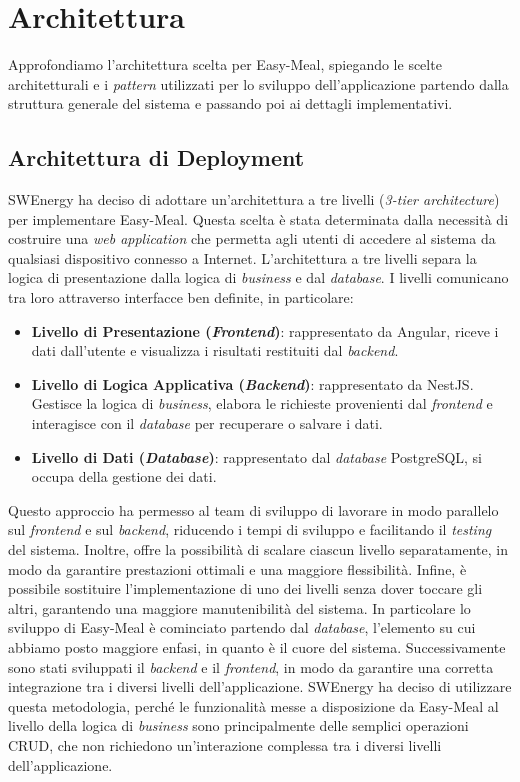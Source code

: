\section{Architettura}

Approfondiamo l'architettura scelta per Easy-Meal, spiegando le scelte
architetturali e i \textit{pattern} utilizzati per lo sviluppo dell'applicazione partendo
dalla struttura generale del sistema e passando poi ai dettagli implementativi.

\subsection{Architettura di Deployment}

SWEnergy ha deciso di adottare un'architettura a tre livelli (\textit{3-tier
architecture}) per implementare Easy-Meal. 
Questa scelta è stata determinata dalla necessità di costruire una 
\textit{web application} che permetta agli utenti di accedere al sistema da qualsiasi 
dispositivo connesso a Internet. L'architettura a tre livelli
separa la logica di presentazione dalla logica di \textit{business} e dal \textit{database}.
I livelli comunicano tra loro attraverso interfacce ben definite, in particolare:
\begin{itemize}
	\item \textbf{Livello di Presentazione (\textit{Frontend})}: rappresentato da Angular, riceve i dati dall'utente e visualizza i risultati restituiti dal \textit{backend}.
	\item \textbf{Livello di Logica Applicativa (\textit{Backend})}: rappresentato da NestJS. Gestisce la logica di \textit{business}, elabora le richieste provenienti dal \textit{frontend} e interagisce con il \textit{database} per recuperare o salvare i dati.
	\item \textbf{Livello di Dati (\textit{Database})}: rappresentato dal \textit{database} PostgreSQL, si occupa della gestione dei dati.
\end{itemize}

Questo approccio ha permesso al team di sviluppo di lavorare in modo parallelo 
sul \textit{frontend} e sul \textit{backend}, riducendo i tempi di sviluppo e 
facilitando il \textit{testing} del sistema. Inoltre, offre la possibilità di scalare ciascun 
livello separatamente, in modo da garantire prestazioni ottimali e una 
maggiore flessibilità. Infine, è possibile sostituire l'implementazione di 
uno dei livelli senza dover toccare gli altri, garantendo una maggiore 
manutenibilità del sistema.
In particolare lo sviluppo di Easy-Meal è cominciato partendo dal \textit{database},
l'elemento su cui abbiamo posto maggiore enfasi, in quanto è il cuore del
sistema. Successivamente sono stati sviluppati il \textit{backend} e il
\textit{frontend}, in modo da garantire una corretta integrazione tra i
diversi livelli dell'applicazione. SWEnergy ha deciso di utilizzare questa
metodologia, perché le funzionalità messe a disposizione da Easy-Meal al livello
della logica di \textit{business} sono principalmente delle semplici operazioni CRUD, che non richiedono
un'interazione complessa tra i diversi livelli dell'applicazione.

